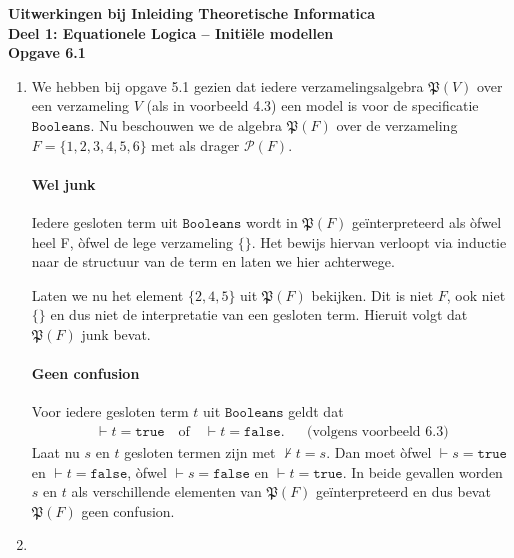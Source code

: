 \documentclass[a4paper,11pt]{article}
\begin{document}
{\bf Uitwerkingen bij Inleiding Theoretische Informatica\\
Deel 1: Equationele Logica -- Initi\"ele modellen}\\[2em]


{\bf Opgave 6.1}

\begin{enumerate}

\item %

We hebben bij opgave 5.1 gezien dat iedere verzamelingsalgebra
$\mathfrak{P}(V)$ over een verzameling $V$ (als in voorbeeld 4.3) een model is
voor de specificatie $\texttt{Booleans}$. Nu beschouwen we de algebra
$\mathfrak{P}(F)$ over de verzameling $F=\{1,2,3,4,5,6\}$ met als drager
$\mathcal{P}(F)$.

\paragraph{Wel junk}

Iedere gesloten term uit $\texttt{Booleans}$ wordt in $\mathfrak{P}(F)$
ge\"interpreteerd als \`ofwel heel F, \`ofwel de lege verzameling $\{\}$. Het
bewijs hiervan verloopt via inductie naar de structuur van de term en laten we
hier achterwege.

Laten we nu het element $\{2,4,5\}$ uit $\mathfrak{P}(F)$ bekijken. Dit is
niet $F$, ook niet $\{\}$ en dus niet de interpretatie van een gesloten
term. Hieruit volgt dat $\mathfrak{P}(F)$ junk bevat.

\paragraph{Geen confusion}

Voor iedere gesloten term $t$ uit $\texttt{Booleans}$ geldt dat
\begin{align*}
\vdash t = \texttt{true} \quad \text{of} \quad \vdash t = \texttt{false}. &&\text{(volgens voorbeeld 6.3)}
\end{align*}
Laat nu $s$ en $t$ gesloten termen zijn met $\not \vdash t = s$. Dan moet
\`ofwel $\vdash s = \texttt{true}$ en $\vdash t = \texttt{false}$, \`ofwel
$\vdash s = \texttt{false}$ en $\vdash t = \texttt{true}$. In beide gevallen
worden $s$ en $t$ als verschillende elementen van $\mathfrak{P}(F)$
ge\"interpreteerd en dus bevat $\mathfrak{P}(F)$ geen confusion.\\[2em]

\item %


\end{enumerate}
\end{document}
